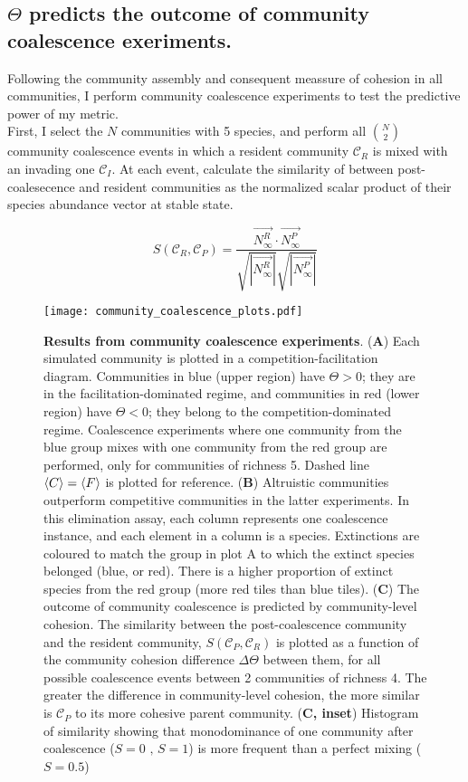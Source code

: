 \documentclass[titlepage,11pt]{article}
\begin{document}
\begin{linenumbers}
			\subsection{$ \Theta $ predicts the outcome of community coalescence exeriments.}
			Following the community assembly and consequent meassure of cohesion in all communities, I perform community coalescence experiments to test the predictive power of my metric.\\
			First, I select the $ N $ communities with 5 species, and perform all $ {N}\choose{2} $ community coalescence events in which a resident community $\mathcal{C}_R$ is mixed with an invading one $ \mathcal{C}_I $. At each event, calculate the similarity of between post-coalesecence  and resident communities as the normalized scalar product of their species abundance vector at stable state.
			\begin{linenomath*}
				\begin{equation}
				S(\mathcal{C}_R, \mathcal{C}_P) = \frac{\vec{N^R_{\infty}} \cdot \vec{N^P_{\infty}}}{\sqrt{|\vec{N^R_{\infty}}|}\sqrt{|\vec{N^P_{\infty}}|}}
				\end{equation}
			\end{linenomath*}
			\begin{figure}
				\centering			
				\texttt{[image: community\_coalescence\_plots.pdf]}
				\caption{\textbf{Results from community coalescence experiments}. (\textbf{A}) Each simulated community is plotted in a competition-facilitation diagram. Communities in blue (upper region) have $ \Theta > 0 $; they are in the facilitation-dominated regime, and communities in red  (lower region) have $ \Theta <0 $; they belong to the competition-dominated regime. Coalescence experiments where one community from the blue group mixes with one community from the red group are performed, only for communities of richness 5. Dashed line $ \braket{C} = \braket{F} $ is plotted for reference. (\textbf{B}) Altruistic communities outperform competitive communities in the latter experiments. In this elimination assay, each column represents one coalescence instance, and each element in a column is a species. Extinctions are coloured to match the group in plot A to which the extinct species belonged (blue, or red). There is a higher proportion of extinct species from the red group (more red tiles than blue tiles). (\textbf{C}) The outcome of community coalescence is predicted by community-level cohesion. The similarity between the post-coalescence community and the resident community, $ S (\mathcal{C}_P, \mathcal{C}_R) $ is plotted as a function of the community cohesion difference $ \Delta \Theta $ between them, for all possible coalescence events between 2 communities of richness 4. The greater the difference in community-level cohesion, the more similar is $ \mathcal{C}_P $ to its more cohesive parent community. (\textbf{C, inset}) Histogram of similarity showing that monodominance of one community after coalescence  ($ S = 0 \text{ , } S = 1 $) is more frequent than a perfect mixing ($ S = 0.5 $) }
				\label{fig:community_coalescence_results}
		\end{figure}
			

\end{linenumbers}
\end{document}
